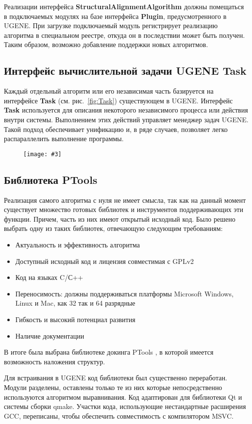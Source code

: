 \documentclass[a4paper, 12pt, titlepage, utf8]{extarticle}
\newenvironment{myfigure}[2]%
{\pushQED{\caption{#1} \label{#2}} %
    \begin{figure}[h!tb]\centering } %
{  \popQED %
    \end{figure}}
\newcommand{\includefigure}[3][]{
\begin{myfigure}{#2}{fig:#3}
    \texttt{[image: \#3]}
\end{myfigure}
}
\newcommand{\lookat}[1]{см. рис.~\ref{#1}}
\newcommand{\class}{\textbf}
\begin{document}
Реализации интерфейса \class{StructuralAlignmentAlgorithm} должны помещаться в подключаемых модулях на базе интерфейса \class{Plugin}, предусмотренного в UGENE. При загрузке подключаемый модуль регистрирует реализацию алгоритма в специальном реестре, откуда он в последствии может быть получен. Таким образом, возможно добавление поддержки новых алгоритмов.

\subsection{Интерфейс вычислительной задачи UGENE Task}
Каждый отдельный алгоритм или его независимая часть базируется на интерфейсе \class{Task} (\lookat{fig:Task}) существующем в UGENE. Интерфейс \class{Task} используется для описания некоторого независимого процесса или действия внутри системы. Выполнением этих действий управляет менеджер задач UGENE. Такой подход обеспечивает унификацию и, в ряде случаев, позволяет легко распараллелить выполнение программы.

\includefigure[scale=0.6]{Интерфейс вычислительной задачи}{Task}

\subsection{Библиотека PTools}
Реализация самого алгоритма с нуля не имеет смысла, так как на данный момент существует множество готовых библиотек и инструментов поддерживающих эти функции. Причем, часть из них имеют открытый исходный код. Было решено выбрать одну из таких библиотек, отвечающую следующим требованиям:

\begin{itemize}
    \item Актуальность и эффективность алгоритма
    \item Доступный исходный код и лицензия совместимая с GPLv2 \cite{gpl}
    \item Код на языках C/С++
    \item Переносимость: должны поддерживаться платформы Microsoft Windows, Linux и Mac, как 32 так и 64 разрядные
    \item Гибкость и высокий потенциал развития
    \item Наличие документации
\end{itemize}

В итоге была выбрана библиотеке докинга PTools \cite{ptools}, в которой имеется возможность наложения структур. 

Для встраивания в UGENE код библиотеки был существенно переработан. Модули разделены, оставлены только те из них которые непосредственно используются алгоритмом выравнивания. Код адаптирован для библиотеки Qt и системы сборки qmake. Участки кода, использующие нестандартные расширения GCC, переписаны, чтобы обеспечить совместимость с компилятором MSVC.
\end{document}
